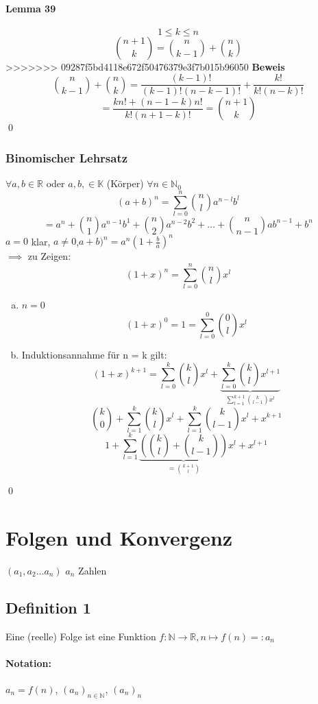 \documentclass[fleqn]{scrbook}
\renewenvironment{proof}{{\bfseries Beweis }}{\qed}
\begin{document}
\subsubsection{Lemma 39} \[1 \leq k \leq n\] \[\binom{n+1}{k} = \binom {n}{k-1} + \binom{n}{k}\]
>>>>>>> 09287f5bd4118e672f50476379e3f7b015b96050
\begin{proof}
	\[ \binom {n}{k-1} + \binom{n}{k} = \frac{(k-1)!}{(k-1)!(n-k-1)!} + \frac{k!}{k!(n-k)!}\]
	\[ = \frac{kn! + (n -1 -k)n!}{k!(n+1-k)!} = \binom{n+1}{k}\]
\end{proof}
\subsection{Binomischer Lehrsatz} $\forall a,b \in \mathbb{R}$ oder $a,b, \in \mathbb{K}$ (Körper) $\forall n \in \mathbb{N}_0$
	\[(a+b)^n = \sum_{l=0}^n \binom{n}{l} a^{n-l}b^l\]
	\[=a^n + \binom{n}{1}a^{n-1}b^1+\binom{n}{2}a^{n-2}b^2+\ldots+\binom{n}{n-1}ab^{n-1}+b^n\]
	\begin{proof}
	$a = 0$ klar, $a \neq 0$,$a+b)^n = a^n(1 + \frac{b}{a})^n$\\
				$\implies$ zu Zeigen: \[(1 + x)^n = \sum_{l =0}^n \binom{n}{l} x^l\]
		\begin{enumerate}[a)]
			\item $n = 0$
				\[(1 + x)^0 = 1 = \sum_{l=0}^0 \binom{0}{l}x^l\]
			\item Induktionsannahme für n = k gilt:
				\[(1+x)^{k+1} = \sum_{l=0}^k \binom{k}{l}x^l+\underbrace{\sum_{l=0}^k\binom{k}{l}x^{l+1}}_{\sum_{l=1}^{k+1}\binom{k}{l-1}x^l}\]
				\[\binom{k}{0} + \sum_{l=1}^k \binom{k}{l}x^l + \sum_{l=1}^k \binom{k}{l-1}x^l + x^{k+1} \]
				\[1+\sum_{l=1}^k\underbrace{\left(\binom{k}{l}+\binom{k}{l-1}\right)}_{=\binom{k+1}{l}}x^l + x^{l+1}\]
		\end{enumerate}
	\end{proof}
\chapter{Folgen und Konvergenz} $(a_1, a_2 \ldots a_n)$ $a_n$ Zahlen

\section{Definition 1} 


Eine (reelle) Folge ist eine Funktion $f: \mathbb{N} \rightarrow \mathbb{R}, n \mapsto f(n) =: a_n$

\subsubsection{Notation:} $a_n = f(n)$, $(a_n)_{n \in \mathbb{N}}$, $(a_n)_n$
\end{document}
